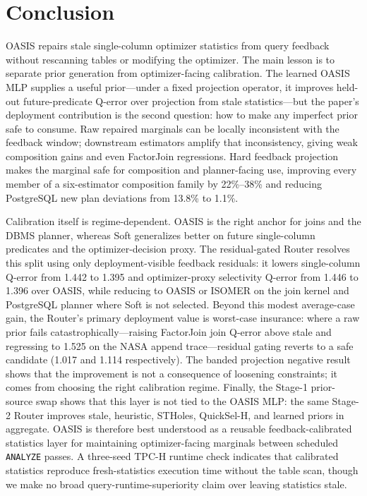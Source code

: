 \documentclass[preprint,12pt]{elsarticle}
\begin{document}
\section{Conclusion}
\label{sec:conclusion}

OASIS repairs stale single-column optimizer statistics from query feedback
without rescanning tables or modifying the optimizer. The main lesson is to
separate prior generation from optimizer-facing calibration. The learned OASIS
MLP supplies a useful prior---under a fixed projection operator, it improves
held-out future-predicate Q-error over projection from stale statistics---but the
paper's deployment contribution is the second question: how to make any
imperfect prior safe to consume. Raw repaired marginals can be locally
inconsistent with the feedback window; downstream estimators amplify that
inconsistency, giving weak composition gains and even FactorJoin regressions.
Hard feedback projection makes the marginal safe for composition and
planner-facing use, improving every member of a six-estimator composition family
by 22\%--38\% and reducing PostgreSQL new plan deviations from 13.8\% to 1.1\%.

Calibration itself is regime-dependent. OASIS is the right anchor for joins and
the DBMS planner, whereas Soft generalizes better on future single-column
predicates and the optimizer-decision proxy. The residual-gated Router resolves
this split using only
deployment-visible feedback residuals: it lowers single-column Q-error from
1.442 to 1.395 and optimizer-proxy selectivity Q-error from 1.446 to 1.396 over
OASIS, while reducing to OASIS or ISOMER on the join kernel and PostgreSQL
planner where Soft is not selected. Beyond this modest average-case gain, the
Router's primary deployment value is worst-case insurance: where a raw prior
fails catastrophically---raising FactorJoin join Q-error above stale and
regressing to 1.525 on the NASA append trace---residual gating reverts to a safe
candidate (1.017 and 1.114 respectively). The banded
projection negative result shows that the improvement is not a consequence of
loosening constraints; it comes from choosing the right calibration regime.
Finally, the Stage-1 prior-source swap shows that this layer is not tied to the
OASIS MLP: the same Stage-2 Router improves stale, heuristic, STHoles,
QuickSel-H, and learned priors in aggregate. OASIS is therefore best understood
as a reusable feedback-calibrated statistics layer for maintaining
optimizer-facing marginals between scheduled \texttt{ANALYZE} passes. A three-seed
TPC-H runtime check indicates that calibrated statistics reproduce
fresh-statistics execution time without the table scan, though we make no broad
query-runtime-superiority claim over leaving statistics stale.



\end{document}
